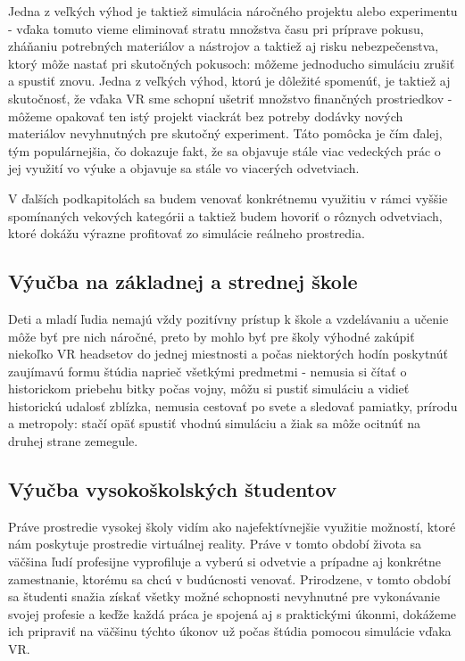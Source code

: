 \documentclass[10pt,twoside,slovak,a4paper]{article}
\begin{document}
Jedna z veľkých výhod je taktiež simulácia náročného projektu alebo experimentu  - vďaka tomuto vieme eliminovať stratu množstva času pri príprave pokusu, zháňaniu potrebných materiálov a nástrojov a taktiež aj risku nebezpečenstva, ktorý môže nastať pri skutočných pokusoch: môžeme jednoducho simuláciu zrušiť a spustiť znovu. Jedna z veľkých výhod, ktorú je dôležité spomenúť, je taktiež aj skutočnosť, že vďaka VR sme schopní ušetriť množstvo finančných prostriedkov - môžeme opakovať ten istý projekt viackrát bez potreby dodávky nových materiálov nevyhnutných pre skutočný experiment. Táto pomôcka je čím ďalej, tým populárnejšia, čo dokazuje fakt, že sa objavuje stále viac vedeckých prác o jej využití vo výuke \cite{vyucovanie} a objavuje sa stále vo viacerých odvetviach.

 V ďalších podkapitolách sa budem venovať konkrétnemu využitiu v rámci vyššie spomínaných vekových kategórii a taktiež budem hovoriť o rôznych odvetviach, ktoré dokážu výrazne profitovať zo simulácie reálneho prostredia.

\subsection{Výučba na základnej a strednej škole} \label{deti}
Deti a mladí ľudia nemajú vždy pozitívny prístup k škole a vzdelávaniu a učenie môže byť pre nich náročné, preto by mohlo byť pre školy výhodné zakúpiť niekoľko VR headsetov do jednej miestnosti a počas niektorých hodín poskytnúť zaujímavú formu štúdia naprieč všetkými predmetmi - nemusia si čítať o historickom priebehu bitky počas vojny, môžu si pustiť simuláciu a vidieť historickú udalosť zblízka, nemusia cestovať po svete a sledovať pamiatky, prírodu a metropoly: stačí opäť spustiť vhodnú simuláciu a žiak sa môže ocitnúť na druhej strane zemegule.

\subsection{Výučba vysokoškolských študentov} \label{studenti}
Práve prostredie vysokej školy vidím ako najefektívnejšie využitie možností, ktoré nám poskytuje prostredie virtuálnej reality. Práve v tomto období života sa väčšina ľudí profesijne vyprofiluje a vyberú si odvetvie a prípadne aj konkrétne zamestnanie, ktorému sa chcú v budúcnosti venovať. Prirodzene, v tomto období sa študenti snažia získať všetky možné schopnosti nevyhnutné pre vykonávanie svojej profesie a keďže každá práca je spojená aj s praktickými úkonmi, dokážeme ich pripraviť na väčšinu týchto úkonov už počas štúdia pomocou simulácie vďaka VR. 
\end{document}

